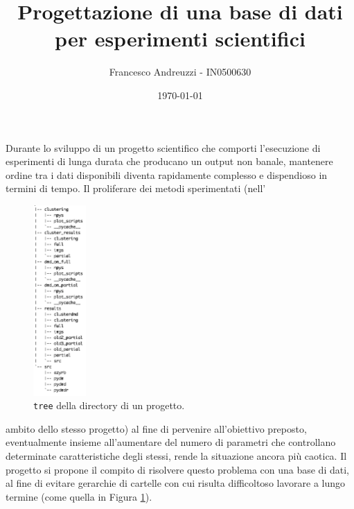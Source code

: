 \documentclass{article}
\title{Progettazione di una base di dati per esperimenti scientifici}
\author{Francesco Andreuzzi - IN0500630}
\date{\today}
\begin{document}
\maketitle

Durante lo sviluppo di un progetto scientifico che comporti l'esecuzione di esperimenti di lunga durata che producano un output non banale, mantenere ordine tra i dati disponibili diventa rapidamente complesso e dispendioso in termini di tempo. Il proliferare dei metodi sperimentati (nell'\hphantom{xcjxxsksjskksksk}
\begin{figure}
    \vspace{-0.9cm}
    \includegraphics[width=2cm]{res/tree_brutto.png}
    \caption{\texttt{tree} della directory di un progetto.}\label{fig:tree}
\end{figure}
{ambito dello stesso progetto) al fine di pervenire all'obiettivo preposto, eventualmente insieme all'aumentare del numero di parametri che controllano determinate caratteristiche degli stessi, rende la situazione ancora più caotica.  Il progetto si propone il compito di risolvere questo problema con una base di dati, al fine di evitare gerarchie di cartelle con cui risulta difficoltoso lavorare a lungo termine (come quella in Figura \ref{fig:tree}).\par}
\end{document}
